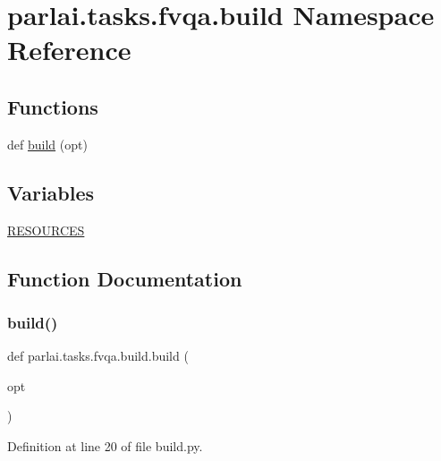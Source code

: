 \hypertarget{namespaceparlai_1_1tasks_1_1fvqa_1_1build}{}\section{parlai.\+tasks.\+fvqa.\+build Namespace Reference}
\label{namespaceparlai_1_1tasks_1_1fvqa_1_1build}
\subsection*{Functions}
\begin{DoxyCompactItemize}
\item 
def \hyperlink{namespaceparlai_1_1tasks_1_1fvqa_1_1build_a3a2e24cb615d980f27a566616af6292c}{build} (opt)
\end{DoxyCompactItemize}
\subsection*{Variables}
\begin{DoxyCompactItemize}
\item 
\hyperlink{namespaceparlai_1_1tasks_1_1fvqa_1_1build_a3a0a95207c9b0e2b156abe6c613c97f3}{R\+E\+S\+O\+U\+R\+C\+ES}
\end{DoxyCompactItemize}


\subsection{Function Documentation}
\mbox{\label{namespaceparlai_1_1tasks_1_1fvqa_1_1build_a3a2e24cb615d980f27a566616af6292c}} 
\subsubsection{\texorpdfstring{build()}{build()}}
{\footnotesize\ttfamily def parlai.\+tasks.\+fvqa.\+build.\+build (\begin{DoxyParamCaption}\item[{}]{opt }\end{DoxyParamCaption})}



Definition at line 20 of file build.\+py.


